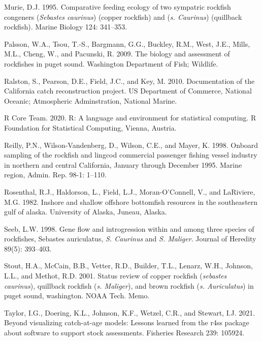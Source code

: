 \documentclass[11pt,
  english,
  letterpaper,
]{article}
\begin{document}
\leavevmode\hypertarget{ref-Murie_diet_1995}{}%
Murie, D.J. 1995. Comparative feeding ecology of two sympatric rockfish congeners (\emph{Sebastes caurinus}) (copper rockfish) and (\emph{s. Caurinus}) (quillback rockfish). Marine Biology 124: 341--353.

\leavevmode\hypertarget{ref-Palssonetal_2009}{}%
Palsson, W.A., Tsou, T.-S., Bargmann, G.G., Buckley, R.M., West, J.E., Mills, M.L., Cheng, W., and Pacunski, R. 2009. The biology and assessment of rockfishes in puget sound. Washington Department of Fish; Wildlife.

\leavevmode\hypertarget{ref-ralston_documentation_2010}{}%
Ralston, S., Pearson, D.E., Field, J.C., and Key, M. 2010. Documentation of the California catch reconstruction project. US Department of Commerce, National Oceanic; Atmospheric Adminstration, National Marine.

\leavevmode\hypertarget{ref-R_2020}{}%
R Core Team. 2020. R: A language and environment for statistical computing. R Foundation for Statistical Computing, Vienna, Austria.

\leavevmode\hypertarget{ref-Reilly1998}{}%
Reilly, P.N., Wilson-Vandenberg, D., Wilson, C.E., and Mayer, K. 1998. Onboard sampling of the rockfish and lingcod commercial passenger fishing vessel industry in northern and central California, January through December 1995. Marine region, Admin. Rep. 98-1: 1--110.

\leavevmode\hypertarget{ref-Rosenthaletal_maturity_1982}{}%
Rosenthal, R.J., Haldorson, L., Field, L.J., Moran-O'Connell, V., and LaRiviere, M.G. 1982. Inshore and shallow offshore bottomfish resources in the southeastern gulf of alaska. University of Alaska, Juneau, Alaska.

\leavevmode\hypertarget{ref-seeb_gene_1998}{}%
Seeb, L.W. 1998. Gene flow and introgression within and among three species of rockfishes, Sebastes auriculatus, \emph{S. Caurinus} and \emph{S. Maliger}. Journal of Heredity 89(5): 393--403.

\leavevmode\hypertarget{ref-Stoutetal_DPS_2001}{}%
Stout, H.A., McCain, B.B., Vetter, R.D., Builder, T.L., Lenarz, W.H., Johnson, L.L., and Methot, R.D. 2001. Status review of copper rockfish (\emph{sebastes caurinus}), quillback rockfish (\emph{s. Maliger}), and brown rockfish (\emph{s. Auriculatus}) in puget sound, washington. NOAA Tech. Memo.

\leavevmode\hypertarget{ref-r4ss_2021}{}%
Taylor, I.G., Doering, K.L., Johnson, K.F., Wetzel, C.R., and Stewart, I.J. 2021. Beyond visualizing catch-at-age models: Lessons learned from the r4ss package about software to support stock assessments. Fisheries Research 239: 105924.
\end{document}
